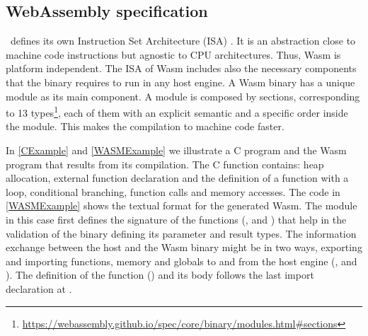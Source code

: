 
%







\subsection{WebAssembly specification}

\wasm\ defines its own Instruction Set Architecture (ISA) \cite{wasm_spec}. It is an abstraction close to machine code instructions but agnostic to CPU architectures. Thus, Wasm  is platform independent. The ISA of Wasm  includes also the necessary components that the binary requires to run in any host engine. 
A Wasm  binary has a unique module as its main component. A module is composed by sections, corresponding to 13 types\footnote{\url{https://webassembly.github.io/spec/core/binary/modules.html\#sections}}, each of them with an explicit semantic and a specific order inside the module. This makes the compilation to machine code faster. %


In \autoref{CExample} and \autoref{WASMExample} we illustrate a C program and the Wasm program that results from its compilation. The C function contains: heap allocation, external function declaration and the definition of a function with a loop, conditional branching, function calls and memory accesses. The code in \autoref{WASMExample} shows the textual format for the generated Wasm. The module in this case first defines the signature of the functions (,   and  )  that help in the validation of the binary defining its parameter and result types. The information exchange between the host and the Wasm  binary might be in two ways, exporting and importing functions, memory and globals to and from the host engine (,  and ). The definition of the function () and its body follows the last import declaration at . 

